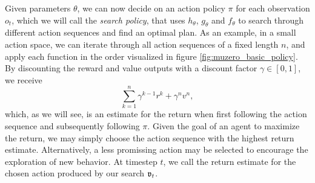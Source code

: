 Given parameters $\theta$, we can now decide on an action policy $\pi$ for each observation $o_t$, which we will call the \textit{search policy}, that uses $h_\theta$, $g_\theta$ and $f_\theta$ to search through different action sequences and find an optimal plan. As an example, in a small action space, we can iterate through all action sequences of a fixed length $n$, and apply each function in the order visualized in figure \ref{fig:muzero_basic_policy}. By discounting the reward and value outputs with a discount factor $\gamma \in [0, 1]$, we receive
\begin{equation*}
    \sum_{k=1}^n \gamma^{k-1} r^k + \gamma^n v^n,
\end{equation*}
which, as we will see, is an estimate for the return when first following the action sequence and subsequently following $\pi$. Given the goal of an agent to maximize the return, we may simply choose the action sequence with the highest return estimate. Alternatively, a less promissing action may be selected to encourage the exploration of new behavior. At timestep $t$, we call the return estimate for the chosen action produced by our search $\mathfrak{v}_t$.
